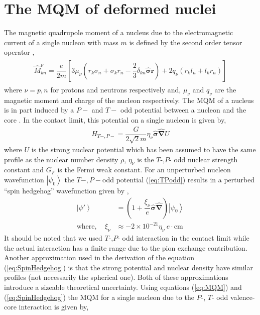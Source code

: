 \documentclass[10pt,a4paper, twoside, openright]{report}
\begin{document}
\section{The MQM of deformed nuclei}
The magnetic quadrupole moment of a nucleus due to the electromagnetic current of a single nucleon with mass $m$ is defined by the second order tensor operator \cite{SFK1984},
\begin{align} \label{eq:MQM}
\begin{split}
\hat{M}_{kn}^{\nu} = \dfrac{e}{2m}\left[3\mu_{\nu}\left(r_k\sigma_n + \sigma_kr_n - \dfrac{2}{3}\delta_{kn}\hat{\boldsymbol{\sigma}}\textbf{r}\right) + 2q_{\nu}\left(r_kl_n + l_kr_n\right)\right]
\end{split}
\end{align}
where $\nu = p,n$ for protons and neutrons respectively and, $\mu_{\nu}$ and $q_{\nu}$ are the magnetic moment and charge of the nucleon respectively. The MQM of a nucleus is in part induced by a $P-$ and $T-$ odd potential between a nucleon and the core \cite{Flambaum1994, SFK1984, KhriplovichPNC}. In the contact limit, this potential on a single nucleon is given by, 
\begin{align} \label{eq:TPodd}
H_{T-,P-} = \dfrac{G}{2\sqrt{2}m}\eta_{\nu}\hat{\boldsymbol{\sigma}}\hat{\boldsymbol{\nabla}}U
\end{align}
where $U$ is the strong nuclear potential which has been assumed to have the same profile as the nuclear number density $\rho$, $\eta_{\nu}$ is the $T$-,$P$- odd nuclear strength constant and $G_{F}$ is the Fermi weak constant. For an unperturbed nucleon wavefunction $\left|\psi_0\right>$ the  $T-,P-$odd potential (\ref{eq:TPodd}) results in a perturbed ``spin hedgehog'' wavefunction given by \cite{SFK1984, Flambaum1994},
\begin{align} \label{eq:SpinHedgehog}
\left|\psi'\right> &= \left(1 + \dfrac{\xi_{\nu}}{e}\hat{\boldsymbol{\sigma}}\hat{\boldsymbol{\nabla}}\right)\left|\psi_0\right> \\
\text{where}, \quad \xi_{\nu} &\approx -2\times 10^{-21}\eta_{\nu} \ e\cdot\text{cm} \nonumber
\end{align}
It should be noted that we used   $T$-,$P$- odd interaction in the contact limit while the actual interaction has a finite range due to the pion exchange contribution. Another approximation used in the derivation of the equation (\ref{eq:SpinHedgehog}) is that the strong potential and nuclear density have similar profiles (not necessarily the  spherical one). Both of these approximations introduce a sizeable theoretical uncertainty.  Using equations (\ref{eq:MQM}) and (\ref{eq:SpinHedgehog}) the MQM for a single nucleon due to the $P$-, $T$- odd valence-core interaction is given by,
\end{document}
